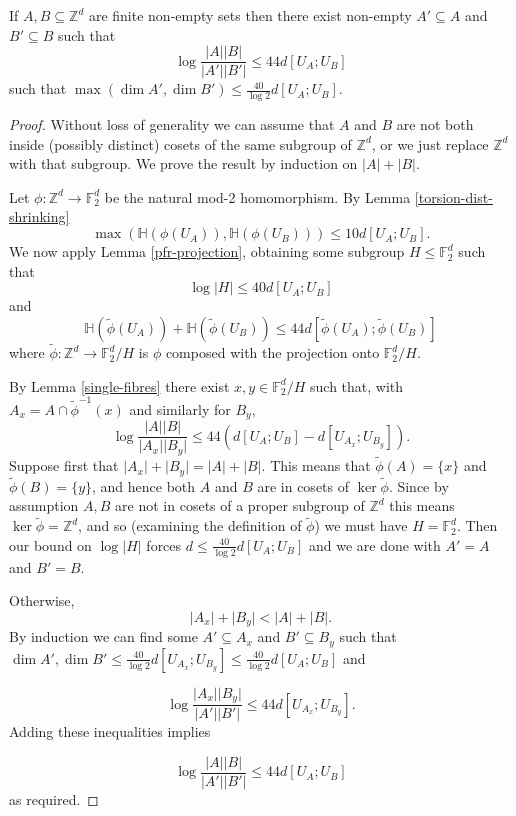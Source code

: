 \begin{theorem}\label{weak-pfr-asymm}\leanok
If $A,B\subseteq \mathbb{Z}^d$ are finite non-empty sets then there exist non-empty $A'\subseteq A$ and $B'\subseteq B$ such that
\[\log\frac{\lvert A\rvert\lvert B\rvert}{\lvert A'\rvert\lvert B'\rvert}\leq 44d[U_A;U_B]\]
such that $\max(\dim A',\dim B')\leq \frac{40}{\log 2} d[U_A;U_B]$.
\end{theorem}
\begin{proof}
\leanok
Without loss of generality we can assume that $A$ and $B$ are not both inside (possibly distinct) cosets of the same subgroup of $\mathbb{Z}^d$, or we just replace $\mathbb{Z}^d$ with that subgroup. We prove the result by induction on $\lvert A\rvert+\lvert B\rvert$.

Let $\phi:\mathbb{Z}^d\to \mathbb{F}_2^d$ be the natural mod-2 homomorphism. By Lemma \ref{torsion-dist-shrinking}
\[\max(\mathbb{H}(\phi(U_A)),\mathbb{H}(\phi(U_B)))\leq 10d[U_A;U_B].\]
We now apply Lemma \ref{pfr-projection}, obtaining some subgroup $H\leq \mathbb{F}_2^d$ such that
\[\log \lvert H\rvert \leq 40d[U_A;U_B]\]
and
\[\mathbb{H}(\tilde{\phi}(U_A))+\mathbb{H}(\tilde{\phi}(U_B))\leq 44 d[\tilde{\phi}(U_A);\tilde{\phi}(U_B)]\]
where $\tilde{\phi}:\mathbb{Z}^d\to \mathbb{F}_2^d/H$ is $\phi$ composed with the projection onto $\mathbb{F}_2^d/H$.


By Lemma \ref{single-fibres} there exist $x,y\in \mathbb{F}_2^d/H$ such that, with $A_x=A\cap \tilde{\phi}^{-1}(x)$ and similarly for $B_y$,
\[\log \frac{\lvert A\rvert\lvert B\rvert}{\lvert A_x\rvert\lvert B_y\rvert}\leq 44(d[U_A;U_B]-d[U_{A_x};U_{B_y}]).\]
Suppose first that $\lvert A_x\rvert+\lvert B_y\rvert=\lvert A\rvert+\lvert B\rvert$. This means that $\tilde{\phi}(A)=\{x\}$ and $\tilde{\phi}(B)=\{y\}$, and hence both $A$ and $B$ are in cosets of $\ker \tilde{\phi}$. Since by assumption $A,B$ are not in cosets of a proper subgroup of $\mathbb{Z}^d$ this means $\ker\tilde{\phi}=\mathbb{Z}^d$, and so (examining the definition of $\tilde{\phi}$) we must have $H=\mathbb{F}_2^d$. Then our bound on $\log\lvert H\rvert$ forces $d\leq \frac{40}{\log 2}d[U_A;U_B]$ and we are done with $A'=A$ and $B'=B$.

Otherwise,
\[\lvert A_x\rvert+\lvert B_y\rvert <\lvert A\rvert+\lvert B\rvert.\]
By induction we can find some $A'\subseteq A_x$ and $B'\subseteq B_y$ such that $\dim A',\dim B'\leq \frac{40}{\log 2} d[U_{A_x};U_{B_y}]\leq \frac{40}{\log 2}d[U_A;U_B]$ and

\[\log \frac{\lvert A_x\rvert\lvert B_y\rvert}{\lvert A'\rvert\lvert B'\rvert}\leq 44d[U_{A_x};U_{B_y}].\]
Adding these inequalities implies

\[\log\frac{\lvert A\rvert\lvert B\rvert}{\lvert A'\rvert\lvert B'\rvert}\leq 44d[U_A;U_B]\]
as required.
\end{proof}

